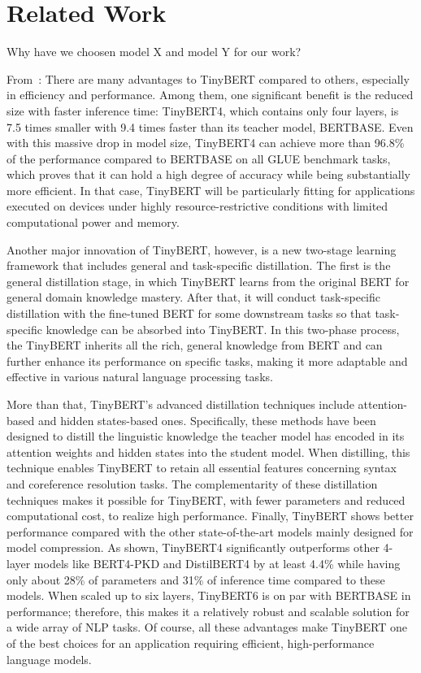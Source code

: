 \section{Related Work}

Why have we choosen model X and model Y for our work?

From~\cite{jiao20}: There are many advantages to TinyBERT compared to others, especially in efficiency and performance. Among them, one significant benefit is the reduced size with faster inference time: TinyBERT4, which contains only four layers, is 7.5 times smaller with 9.4 times faster than its teacher model, BERTBASE. Even with this massive drop in model size, TinyBERT4 can achieve more than 96.8\% of the performance compared to BERTBASE on all GLUE benchmark tasks, which proves that it can hold a high degree of accuracy while being substantially more efficient. In that case, TinyBERT will be particularly fitting for applications executed on devices under highly resource-restrictive conditions with limited computational power and memory.

Another major innovation of TinyBERT, however, is a new two-stage learning framework that includes general and task-specific distillation. The first is the general distillation stage, in which TinyBERT learns from the original BERT for general domain knowledge mastery.  After that, it will conduct task-specific distillation with the fine-tuned BERT for some downstream tasks so that task-specific knowledge can be absorbed into TinyBERT. In this two-phase process, the TinyBERT inherits all the rich, general knowledge from BERT and can further enhance its performance on specific tasks, making it more adaptable and effective in various natural language processing tasks.

More than that, TinyBERT's advanced distillation techniques include attention-based and hidden states-based ones. Specifically, these methods have been designed to distill the linguistic knowledge the teacher model has encoded in its attention weights and hidden states into the student model. When distilling, this technique enables TinyBERT to retain all essential features concerning syntax and coreference resolution tasks. The complementarity of these distillation techniques makes it possible for TinyBERT, with fewer parameters and reduced computational cost, to realize high performance. Finally, TinyBERT shows better performance compared with the other state-of-the-art models mainly designed for model compression. As shown, TinyBERT4 significantly outperforms other 4-layer models like BERT4-PKD and DistilBERT4 by at least 4.4\% while having only about 28\% of parameters and 31\% of inference time compared to these models. When scaled up to six layers, TinyBERT6 is on par with BERTBASE in performance; therefore, this makes it a relatively robust and scalable solution for a wide array of NLP tasks. Of course, all these advantages make TinyBERT one of the best choices for an application requiring efficient, high-performance language models.\\


